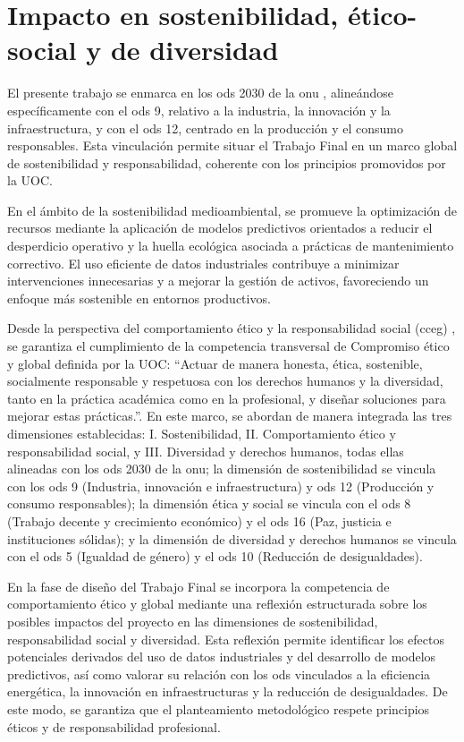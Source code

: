 \documentclass[IB]{TFUOC}
\begin{document}
\section{Impacto en sostenibilidad, ético-social y de diversidad}
\label{s:etic}

El presente trabajo se enmarca en los \gls{ods} 2030 de la \gls{onu} \cite{nu2026ods}, alineándose específicamente con
el \gls{ods} 9, relativo a la industria, la innovación y la infraestructura, y con el \gls{ods} 12, centrado en la
producción y el consumo responsables. Esta vinculación permite situar el Trabajo Final en un marco global de
sostenibilidad y responsabilidad, coherente con los principios promovidos por la UOC.

En el ámbito de la sostenibilidad medioambiental, se promueve la optimización de recursos mediante la aplicación de
modelos predictivos orientados a reducir el desperdicio operativo y la huella ecológica asociada a prácticas de
mantenimiento correctivo. El uso eficiente de datos industriales contribuye a minimizar intervenciones innecesarias y a
mejorar la gestión de activos, favoreciendo un enfoque más sostenible en entornos productivos.

Desde la perspectiva del comportamiento ético y la responsabilidad social (\gls{cceg}) \cite{UOC2022CCEG}, se garantiza
el cumplimiento de la competencia transversal de Compromiso ético y global definida por la UOC: “Actuar de manera
honesta, ética, sostenible, socialmente responsable y respetuosa con los derechos humanos y la diversidad, tanto en la
práctica académica como en la profesional, y diseñar soluciones para mejorar estas prácticas.”. En este marco, se
abordan de manera integrada las tres dimensiones establecidas: I. Sostenibilidad, II. Comportamiento ético y
responsabilidad social, y III. Diversidad y derechos humanos, todas ellas alineadas con los \gls{ods} 2030 de la
\gls{onu}; la dimensión de sostenibilidad se vincula con los \gls{ods} 9 (Industria, innovación e infraestructura) y
\gls{ods} 12 (Producción y consumo responsables); la dimensión ética y social se vincula con el \gls{ods} 8 (Trabajo
decente y crecimiento económico) y el \gls{ods} 16 (Paz, justicia e instituciones sólidas); y la dimensión de diversidad
y derechos humanos se vincula con el \gls{ods} 5 (Igualdad de género) y el \gls{ods} 10 (Reducción de desigualdades).

En la fase de diseño del Trabajo Final se incorpora la competencia de comportamiento ético y global mediante una
reflexión estructurada sobre los posibles impactos del proyecto en las dimensiones de sostenibilidad, responsabilidad
social y diversidad. Esta reflexión permite identificar los efectos potenciales derivados del uso de datos industriales
y del desarrollo de modelos predictivos, así como valorar su relación con los \gls{ods} vinculados a la eficiencia
energética, la innovación en infraestructuras y la reducción de desigualdades. De este modo, se garantiza que el
planteamiento metodológico respete principios éticos y de responsabilidad profesional.
\end{document}
